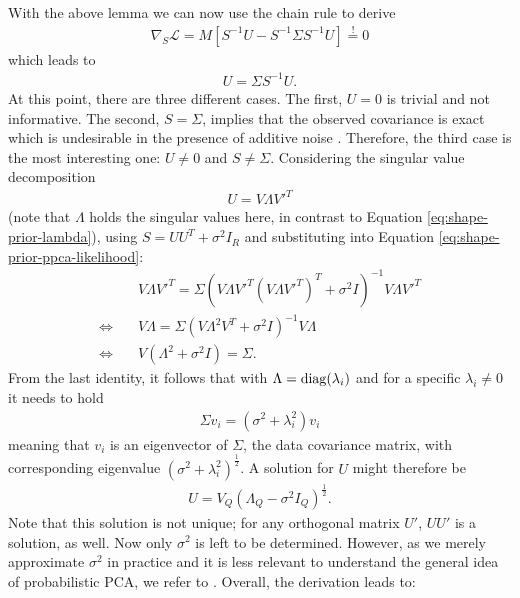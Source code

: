 With the above lemma we can now use the chain rule to derive
\begin{align}
  \nabla_{S} \mathcal{L} = M\left[S^{-1} U - S^{-1} \Sigma S^{-1} U\right]\overset{!}{=} 0
\end{align}
which leads to
\begin{align}
  U = \Sigma S^{-1} U\label{eq:shape-prior-ppca-likelihood}.
\end{align}
At this point, there are three different cases. The first, $U = 0$ is trivial
and not informative. The second, $S = \Sigma$, implies that the observed
covariance is exact which is undesirable in the presence of additive noise
\cite{TippingBishop:1999}. Therefore, the third case is the most interesting one:
$U \neq 0$ and $S \neq \Sigma$. Considering the singular value decomposition
\begin{align}
  U = V \Lambda V'^T
\end{align}
(note that $\Lambda$ holds the singular values here, in contrast to
Equation \eqref{eq:shape-prior-lambda}), using $S = UU^T + \sigma^2 I_R$
and substituting into 
Equation \eqref{eq:shape-prior-ppca-likelihood}:
\begin{align}
  &V \Lambda V'^T = \Sigma (V \Lambda V'^T (V \Lambda V'^T)^T + \sigma^2I)^{-1} V \Lambda V'^T\\
  \Leftrightarrow\quad& V \Lambda = \Sigma (V \Lambda^2 V^T + \sigma^2 I)^{-1} V \Lambda\\
  \Leftrightarrow\quad& V (\Lambda^2 + \sigma^2I) = \Sigma .
\end{align}
From the last identity, it follows that with $\Lambda = \mathrm{diag}(\lambda_i)$
and for a specific $\lambda_i \neq 0$ it needs to hold
\begin{align}
  \Sigma v_i = (\sigma^2 + \lambda_i^2)v_i
\end{align}
meaning that $v_i$ is an eigenvector of $\Sigma$, \ie
the data covariance matrix, with corresponding eigenvalue
$(\sigma^2 + \lambda_i^2)^{\frac{1}{2}}$.
A solution for $U$ might therefore be
\begin{align}
  U = V_Q (\Lambda_Q - \sigma^2I_Q)^\frac{1}{2}.
\end{align}
Note that this solution is not unique; for any orthogonal matrix $U'$,
$UU'$ is a solution, as well. Now only $\sigma^2$ is left to be determined.
However, as we merely approximate $\sigma^2$ in practice and it is less
relevant to understand the general idea of probabilistic PCA, we refer
to \cite{TippingBishop:1999}. Overall, the derivation leads to:

